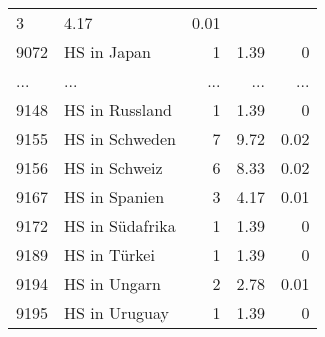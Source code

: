 \begin{longtable}{lXrrr}
          \num{3} &
          \num[round-mode=places,round-precision=2]{4.17} &
          \num[round-mode=places,round-precision=2]{0.01} \\
        9072 & \multicolumn{1}{X}{HS in Japan} & %
          \num{1} &
          \num[round-mode=places,round-precision=2]{1.39} &
          \num[round-mode=places,round-precision=2]{0} \\
       ... & ... & ... & ... & ... \\
        9148 & \multicolumn{1}{X}{HS in Russland} & %
          \num{1} &
          \num[round-mode=places,round-precision=2]{1.39} &
          \num[round-mode=places,round-precision=2]{0} \\

        9155 & \multicolumn{1}{X}{HS in Schweden} & %
          \num{7} &
          \num[round-mode=places,round-precision=2]{9.72} &
          \num[round-mode=places,round-precision=2]{0.02} \\

        9156 & \multicolumn{1}{X}{HS in Schweiz} & %
          \num{6} &
          \num[round-mode=places,round-precision=2]{8.33} &
          \num[round-mode=places,round-precision=2]{0.02} \\

        9167 & \multicolumn{1}{X}{HS in Spanien} & %
          \num{3} &
          \num[round-mode=places,round-precision=2]{4.17} &
          \num[round-mode=places,round-precision=2]{0.01} \\

        9172 & \multicolumn{1}{X}{HS in Südafrika} & %
          \num{1} &
          \num[round-mode=places,round-precision=2]{1.39} &
          \num[round-mode=places,round-precision=2]{0} \\

        9189 & \multicolumn{1}{X}{HS in Türkei} & %
          \num{1} &
          \num[round-mode=places,round-precision=2]{1.39} &
          \num[round-mode=places,round-precision=2]{0} \\

        9194 & \multicolumn{1}{X}{HS in Ungarn} & %
          \num{2} &
          \num[round-mode=places,round-precision=2]{2.78} &
          \num[round-mode=places,round-precision=2]{0.01} \\

        9195 & \multicolumn{1}{X}{HS in Uruguay} & %
          \num{1} &
          \num[round-mode=places,round-precision=2]{1.39} &
          \num[round-mode=places,round-precision=2]{0} \\


\end{longtable}
